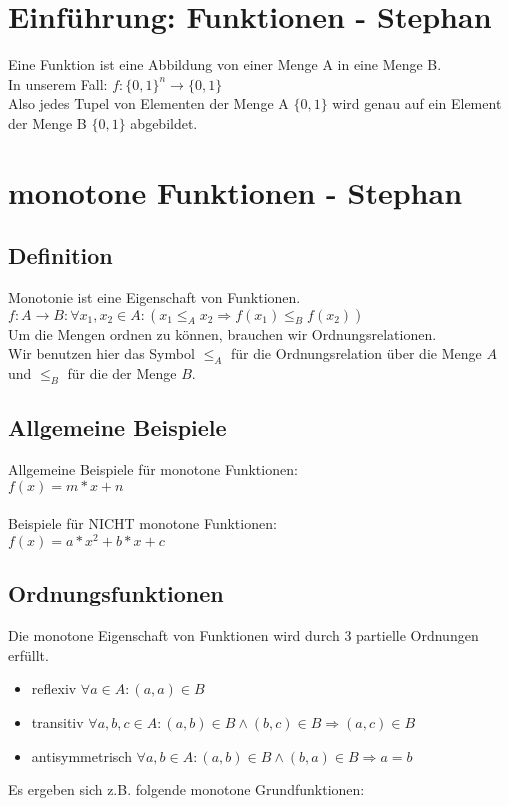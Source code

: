 \documentclass[a4paper,10pt]{article}
\title{}
\author{}
\begin{document}
  \section{Einführung: Funktionen - Stephan}
    Eine Funktion ist eine Abbildung von einer Menge A in eine Menge B.\\
    In unserem Fall: $f: \{0,1\}^{n} \rightarrow \{0,1\}$ \\
    Also jedes Tupel von Elementen der Menge A $\{0, 1\}$ wird genau auf ein Element der Menge B $\{0, 1\}$ abgebildet.

  \section{monotone Funktionen - Stephan}
  \subsection{Definition}
    Monotonie ist eine Eigenschaft von Funktionen.\\
    $f:A \rightarrow B: \forall x_1,x_2 \in A : (x_1 \leq_A x_2 \Rightarrow f(x_1) \leq_B f(x_2))$\\
    Um die Mengen ordnen zu können, brauchen wir Ordnungsrelationen.\\
    Wir benutzen hier das Symbol $\leq_A$ für die Ordnungsrelation über die Menge $A$ und $\leq_B$ für die der Menge $B$.


  \subsection{Allgemeine Beispiele}

    Allgemeine Beispiele für monotone Funktionen:\\
    $f(x) = m * x + n$ \\
    \\Beispiele für NICHT monotone Funktionen:\\
    $f(x) = a * x^2 + b * x + c$


  \subsection{Ordnungsfunktionen}
    Die monotone Eigenschaft von Funktionen wird durch 3 partielle Ordnungen erfüllt.
    \begin{itemize}
      \item reflexiv $\forall a \in A: (a,a) \in B$\\
      \item transitiv $\forall a,b,c \in A: (a,b) \in B \land (b,c) \in B \Rightarrow (a,c) \in B$\\
      \item antisymmetrisch $\forall a,b \in A: (a,b) \in B \land (b,a) \in B \Rightarrow a=b$\\
    \end{itemize}
    Es ergeben sich z.B. folgende monotone Grundfunktionen:\\
\end{document}

